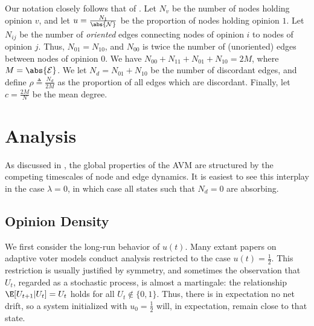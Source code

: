\documentclass[english]{scrartcl}
\begin{document}
	Our notation closely follows that of \cite{Durrett2012}. Let $N_v$ be the number of nodes holding opinion $v$, and let $u = \frac{N_1}{\abs{\mathcal{N}}}$ be the proportion of nodes holding opinion $1$. Let $N_{ij}$ be the number of \emph{oriented} edges connecting nodes of opinion $i$ to nodes of opinion $j$. Thus, $N_{01} = N_{10}$, and $N_{00}$ is twice the number of (unoriented) edges between nodes of opinion $0$. We have $N_{00} + N_{11} + N_{01} + N_{10} = 2M$, where $M = \abs{\mathcal{E}}$. We let $N_d = N_{01} + N_{10}$ be the number of discordant edges, and  define $\rho \triangleq \frac{N_d}{2M}$ as the proportion of all edges which are discordant. Finally, let $c = \frac{2M}{N}$ be the mean degree. 

\section{Analysis}
	As discussed in \cite{Durrett2012}, the global properties of the AVM are structured by the competing timescales of node and edge dynamics. 
	It is easiest to see this interplay in the case $\lambda = 0$, in which case all states such that $N_d = 0$ are absorbing. 

	\subsection{Opinion Density}
		We first consider the long-run behavior of $u(t)$. 
		Many extant papers on adaptive voter models \cite{Demirel2012,Ji2013} conduct analysis restricted to the case $u(t) = \frac{1}{2}$.
		This restriction is usually justified by symmetry, and sometimes the observation that $U_t$, regarded as a stochastic process, is almost a martingale: the relationship $\E[U_{t+1}|U_t] = U_t$ holds for all $U_t \notin \{0,1\}$.
		Thus, there is in expectation no net drift, so a system initialized with $u_0 = \frac{1}{2}$ will, in expectation, remain close to that state. 
\end{document}
